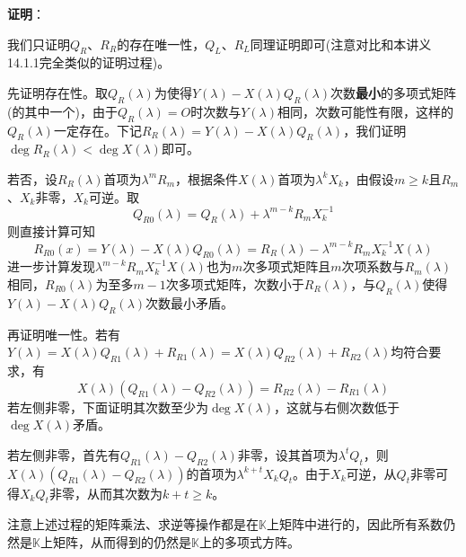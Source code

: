 \documentclass[a4paper,UTF8,fontset=windows,AutoFakeBold]{ctexart}
\newcommand{\proo}[1]{{\vspace{5pt}\kaishu\noindent\textbf{证明}：\vspace{-3pt}
\begin{compactitem}
    \item[] #1
\end{compactitem}
}}
\begin{document}
\proo{
    我们只证明$Q_R$、$R_R$的存在唯一性，$Q_L$、$R_L$同理证明即可(注意对比和本讲义14.1.1完全类似的证明过程)。

    先证明存在性。取$Q_R(\lambda)$为使得$Y(\lambda)-X(\lambda)Q_R(\lambda)$次数\textbf{最小}的多项式矩阵(的其中一个)，由于$Q_R(\lambda)=O$时次数与$Y(\lambda)$相同，次数可能性有限，这样的$Q_R(\lambda)$一定存在。下记$R_R(\lambda)=Y(\lambda)-X(\lambda)Q_R(\lambda)$，我们证明$\deg R_R(\lambda)<\deg X(\lambda)$即可。
    
    若否，设$R_R(\lambda)$首项为$\lambda^mR_m$，根据条件$X(\lambda)$首项为$\lambda^kX_k$，由假设$m\ge k$且$R_m$、$X_k$非零，$X_k$可逆。取
    $$Q_{R0}(\lambda)=Q_R(\lambda)+\lambda^{m-k}R_mX_k^{-1}$$
    则直接计算可知
    $$R_{R0}(x)=Y(\lambda)-X(\lambda)Q_{R0}(\lambda)=R_R(\lambda)-\lambda^{m-k}R_mX_k^{-1}X(\lambda)$$
    进一步计算发现$\lambda^{m-k}R_mX_k^{-1}X(\lambda)$也为$m$次多项式矩阵且$m$次项系数与$R_m(\lambda)$相同，$R_{R0}(\lambda)$为至多$m-1$次多项式矩阵，次数小于$R_R(\lambda)$，与$Q_R(\lambda)$使得$Y(\lambda)-X(\lambda)Q_R(\lambda)$次数最小矛盾。

    再证明唯一性。若有$Y(\lambda)=X(\lambda)Q_{R1}(\lambda)+R_{R1}(\lambda)=X(\lambda)Q_{R2}(\lambda)+R_{R2}(\lambda)$均符合要求，有
    $$X(\lambda)(Q_{R1}(\lambda)-Q_{R2}(\lambda))=R_{R2}(\lambda)-R_{R1}(\lambda)$$
    若左侧非零，下面证明其次数至少为$\deg X(\lambda)$，这就与右侧次数低于$\deg X(\lambda)$矛盾。

    若左侧非零，首先有$Q_{R1}(\lambda)-Q_{R2}(\lambda)$非零，设其首项为$\lambda^tQ_t$，则$X(\lambda)(Q_{R1}(\lambda)-Q_{R2}(\lambda))$的首项为$\lambda^{k+t}X_kQ_t$。由于$X_k$可逆，从$Q_t$非零可得$X_kQ_t$非零，从而其次数为$k+t\ge k$。

    注意上述过程的矩阵乘法、求逆等操作都是在$\mathbb{K}$上矩阵中进行的，因此所有系数仍然是$\mathbb{K}$上矩阵，从而得到的仍然是$\mathbb{K}$上的多项式方阵。
}

\
\end{document}
